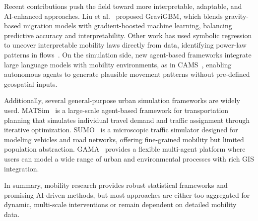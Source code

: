 \documentclass[pdflatex,sn-mathphys-num]{sn-jnl}%
\theoremstyle{thmstyleone}%
\theoremstyle{thmstyletwo}%
\theoremstyle{thmstylethree}%
\begin{document}
{Recent contributions push the field toward more interpretable, adaptable, and AI-enhanced approaches. Liu et al.~\citep{liu2024GraviGBM} proposed GraviGBM, which blends gravity-based migration models with gradient-boosted machine learning, balancing predictive accuracy and interpretability. Other work has used symbolic regression to uncover interpretable mobility laws directly from data, identifying power-law patterns in flows~\citep{guo2025datadrivendiscoveryhuman}. %
On the simulation side, new agent-based frameworks integrate large language models with mobility environments, as in CAMS~\citep{du2025camscitygptpoweredagenticframework}, enabling autonomous agents to generate plausible movement patterns without pre-defined geospatial inputs.

Additionally, several general-purpose urban simulation frameworks are widely used. MATSim~\citep{balmer2009matsim} is a large-scale agent-based framework for transportation planning that simulates individual travel demand and traffic assignment through iterative optimization. SUMO~\citep{krajzewicz2012sumo} is a microscopic traffic simulator designed for modeling vehicles and road networks, offering fine-grained mobility but limited population abstraction. GAMA~\citep{taillandier2019gama} provides a flexible multi-agent platform where users can model a wide range of urban and environmental processes with rich GIS integration.

In summary, mobility research provides robust statistical frameworks and promising AI-driven methods, but most approaches are either too aggregated for dynamic, multi-scale interventions or remain dependent on detailed mobility data.
}
\end{document}
